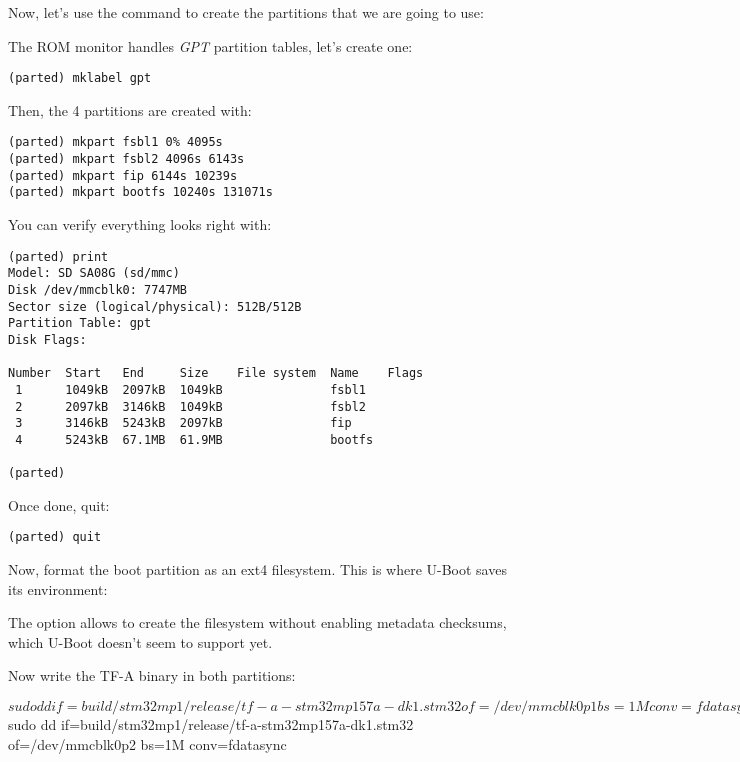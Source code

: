 
Now, let's use the  command to create the partitions that
we are going to use:


The ROM monitor handles {\em GPT} partition tables, let's create one:

\begin{verbatim}
(parted) mklabel gpt
\end{verbatim}

Then, the 4 partitions are created with:
\begin{verbatim}
(parted) mkpart fsbl1 0% 4095s
(parted) mkpart fsbl2 4096s 6143s
(parted) mkpart fip 6144s 10239s
(parted) mkpart bootfs 10240s 131071s
\end{verbatim}

You can verify everything looks right with:

\begin{verbatim}
(parted) print
Model: SD SA08G (sd/mmc)
Disk /dev/mmcblk0: 7747MB
Sector size (logical/physical): 512B/512B
Partition Table: gpt
Disk Flags:

Number  Start   End     Size    File system  Name    Flags
 1      1049kB  2097kB  1049kB               fsbl1
 2      2097kB  3146kB  1049kB               fsbl2
 3      3146kB  5243kB  2097kB               fip
 4      5243kB  67.1MB  61.9MB               bootfs

(parted)
\end{verbatim}

Once done, quit:
\begin{verbatim}
(parted) quit
\end{verbatim}

Now, format the boot partition as an ext4 filesystem. This is where
U-Boot saves its environment:

The  option allows to create the filesystem
without enabling metadata checksums, which U-Boot doesn't seem to
support yet.

Now write the TF-A binary in both  partitions:

\begin{bashinput}
$ sudo dd if=build/stm32mp1/release/tf-a-stm32mp157a-dk1.stm32 of=/dev/mmcblk0p1 bs=1M conv=fdatasync
$ sudo dd if=build/stm32mp1/release/tf-a-stm32mp157a-dk1.stm32 of=/dev/mmcblk0p2 bs=1M conv=fdatasync
\end{bashinput}

